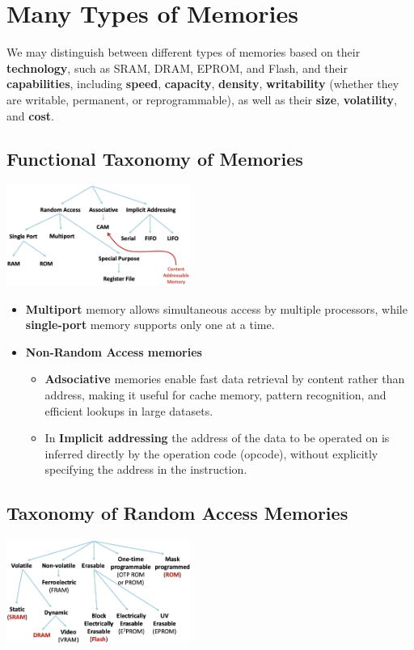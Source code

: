 \section{Many Types of Memories}
We may distinguish between different types of memories based on their \textbf{technology}, such as SRAM, DRAM, EPROM, and Flash, and their \textbf{capabilities}, including \textbf{speed}, \textbf{capacity}, \textbf{density}, \textbf{writability} (whether they are writable, permanent, or reprogrammable), as well as their \textbf{size}, \textbf{volatility}, and \textbf{cost}. \\ \vspace*{5px}
\subsection{Functional Taxonomy of Memories}
\begin{center} \includegraphics[width=0.45\textwidth]{chapters/chapter1c/images/funct_tax.png} \end{center}
\begin{itemize}
    \item[] \textbf{Multiport} memory allows simultaneous access by multiple processors, while \textbf{single-port} memory supports only one at a time.
    \item[] \textbf{Non-Random Access memories}
    \begin{itemize}
        \item \textbf{Adsociative} memories enable fast data retrieval by content rather than address, making it useful for cache memory, pattern recognition, and efficient lookups in large datasets.
        \item In \textbf{Implicit addressing} the address of the data to be operated on is inferred directly by the operation code (opcode), without explicitly specifying the address in the instruction.
    \end{itemize}
\end{itemize}


\subsection{Taxonomy of Random Access Memories}
\begin{center}
\includegraphics[width=0.45\textwidth]{chapters/chapter1c/images/ram_tax.png}
\end{center}
\newpage

